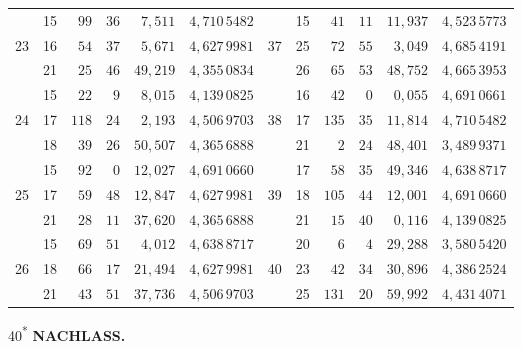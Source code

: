 \begin{center}
\begin{tabular}{|c|c|r@{\;}r@{\;}r|c||c|c|r@{\;}r@{\;}r|c|}
 & 15 & $99$ & $36$ & $7{,}511$ & $4{,}710\,5482$ &  & 15 & $41$ & $11$ & $11{,}937$ & $4{,}523\,5773$\\
23 & 16 & $54$ & $37$ & $5{,}671$ & $4{,}627\,9981$ & 37 & 25 & $72$ & $55$ & $3{,}049$ & $4{,}685\,4191$\\
 & 21 & $25$ & $46$ & $49{,}219$ & $4{,}355\,0834$ &  & 26 & $65$ & $53$ & $48{,}752$ & $4{,}665\,3953$\\[3pt]
 & 15 & $22$ & $9$ & $8{,}015$ & $4{,}139\,0825$ &  & 16 & $42$ & $0$ & $0{,}055$ & $4{,}691\,0661$\\
24 & 17 & $118$ & $24$ & $2{,}193$ & $4{,}506\,9703$ & 38 & 17 & $135$ & $35$ & $11{,}814$ & $4{,}710\,5482$\\
 & 18 & $39$ & $26$ & $50{,}507$ & $4{,}365\,6888$ &  & 21 & $2$ & $24$ & $48{,}401$ & $3{,}489\,9371$\\[3pt]
 & 15 & $92$ & $0$ & $12{,}027$ & $4{,}691\,0660$ &  & 17 & $58$ & $35$ & $49{,}346$ & $4{,}638\,8717$\\
25 & 17 & $59$ & $48$ & $12{,}847$ & $4{,}627\,9981$ & 39 & 18 & $105$ & $44$ & $12{,}001$ & $4{,}691\,0660$\\
 & 21 & $28$ & $11$ & $37{,}620$ & $4{,}365\,6888$ &  & 21 & $15$ & $40$ & $0{,}116$ & $4{,}139\,0825$\\[3pt]
 & 15 & $69$ & $51$ & $4{,}012$ & $4{,}638\,8717$ &  & 20 & $6$ & $4$ & $29{,}288$ & $3{,}580\,5420$\\
26 & 18 & $66$ & $17$ & $21{,}494$ & $4{,}627\,9981$ & 40 & 23 & $42$ & $34$ & $30{,}896$ & $4{,}386\,2524$\\
 & 21 & $43$ & $51$ & $37{,}736$ & $4{,}506\,9703$ &  & 25 & $131$ & $20$ & $59{,}992$ & $4{,}431\,4071$\\
\end{tabular}\end{center}
\hfill40\textsuperscript{*}
\clearpage
{}\hfill\textbf{NACHLASS.}
